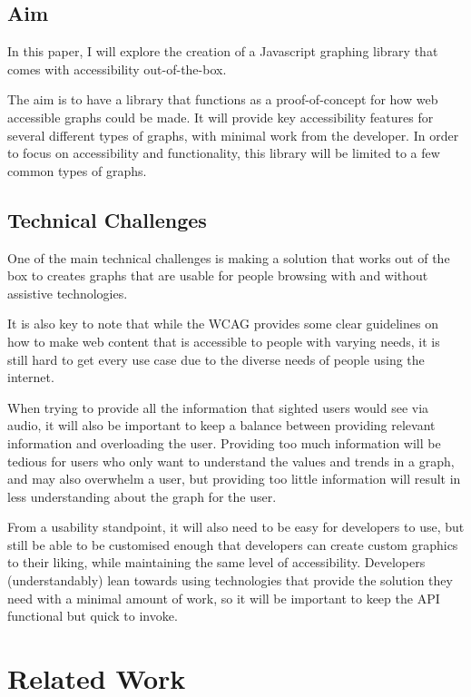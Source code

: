 \documentclass[ %
                    author={Aleena Baig},
                supervisor={Dr Simon Lock},
                    degree={BSc},
                     title={On Making Web Accessible Graphs},
                  subtitle={},
                      year={2019} ]{dissertation}
\begin{document}
\subsection{Aim}

In this paper, I will explore the creation of a Javascript graphing library that comes with accessibility out-of-the-box.

The aim is to have a library that functions as a proof-of-concept for how web accessible graphs could be made. It will provide key accessibility features for several different types of graphs, with minimal work from the developer. In order to focus on accessibility and functionality, this library will be limited to a few common types of graphs.

\subsection{Technical Challenges}

One of the main technical challenges is making a solution that works out of the box to creates graphs that are usable for people browsing with and without assistive technologies.

It is also key to note that while the WCAG provides some clear guidelines on how to make web content that is accessible to people with varying needs, it is still hard to get every use case due to the diverse needs of people using the internet.

When trying to provide all the information that sighted users would see via audio, it will also be important to keep a balance between providing relevant information and overloading the user. Providing too much information will be tedious for users who only want to understand the values and trends in a graph, and may also overwhelm a user, but providing too little information will result in less understanding about the graph for the user.

From a usability standpoint, it will also need to be easy for developers to use, but still be able to be customised enough that developers can create custom graphics to their liking, while maintaining the same level of accessibility. Developers (understandably) lean towards using technologies that provide the solution they need with a minimal amount of work, so it will be important to keep the API functional but quick to invoke.

\section{Related Work}
\end{document}
